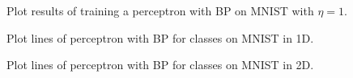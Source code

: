 \documentclass[journal]{IEEEtran}
\begin{document}
\begin{figure}
	\centering
	\caption{Plot results of training a perceptron with BP on MNIST with $\eta=1$.}
	\label{fig:mnistperceptronbp}
\end{figure}

\begin{figure}
	\centering
	\caption{Plot lines of perceptron with BP for classes on MNIST in 1D.}
	\label{fig:mnistperceptronlinebp1dpca}
\end{figure}

\begin{figure}
	\centering
	\caption{Plot lines of perceptron with BP for classes on MNIST in 2D.}
	\label{fig:mnistperceptronlinebp2dpca}
\end{figure}
\end{document}

